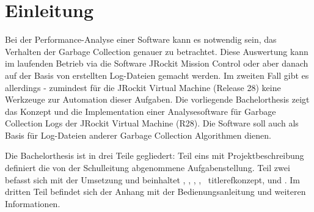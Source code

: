 \chapter*{Einleitung}
Bei der Performance-Analyse einer Software kann es notwendig sein, das  Verhalten der Garbage Collection genauer zu betrachtet. Diese Auswertung kann im laufenden Betrieb via die Software JRockit Mission Control oder aber danach auf der Basis von erstellten Log-Dateien gemacht werden. Im zweiten Fall gibt es allerdings - zumindest für die JRockit Virtual Machine (Release 28) keine Werkzeuge zur Automation dieser Aufgaben. Die vorliegende Bachelorthesis zeigt das Konzept und die Implementation einer Analysesoftware für Garbage Collection Logs der JRockit Virtual Machine (R28). Die Software soll auch als Basis für Log-Dateien anderer Garbage Collection Algorithmen dienen.

Die Bachelorthesis ist in drei Teile gegliedert: Teil eins mit Projektbeschreibung definiert die von der Schulleitung abgenommene Aufgabenstellung. Teil zwei befasst sich mit der Umsetzung und beinhaltet , , , , \, titleref{konzept},  und . Im dritten Teil befindet sich der Anhang mit der Bedienungsanleitung und weiteren Informationen.